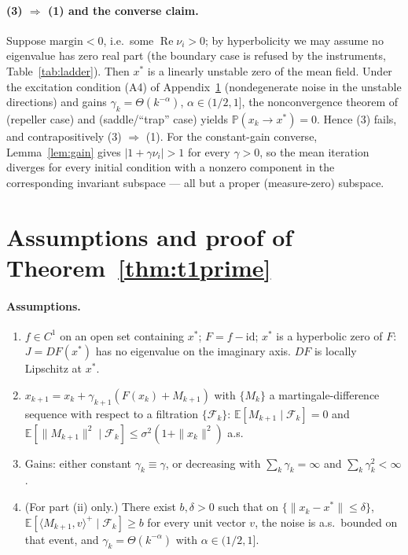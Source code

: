 \documentclass[pmlr]{jmlr}
\newcommand{\E}{\mathbb{E}}
\newcommand{\Prob}{\mathbb{P}}
\newcommand{\margin}{\mathrm{margin}}
\begin{document}
\paragraph{(3) $\Rightarrow$ (1) and the converse claim.} Suppose $\margin < 0$, i.e.\ some
$\operatorname{Re}\nu_i > 0$; by hyperbolicity we may assume no eigenvalue has zero real part
(the boundary case is refused by the instruments, Table~\ref{tab:ladder}). Then $x^*$ is a
linearly unstable zero of the mean field. Under the excitation condition (A4) of
Appendix~\ref{app:t1prime} (nondegenerate noise in the unstable directions) and gains
$\gamma_k = \Theta(k^{-\alpha})$, $\alpha \in (1/2, 1]$, the nonconvergence theorem of
\citet{pemantle1990nonconvergence} (repeller case) and \citet{brandiere1996algorithmes}
(saddle/``trap'' case) yields $\Prob(x_k \to x^*) = 0$. Hence (3) fails, and contrapositively
(3) $\Rightarrow$ (1). For the constant-gain converse, Lemma~\ref{lem:gain} gives
$|1 + \gamma\nu_i| > 1$ for every $\gamma > 0$, so the mean iteration diverges for every initial
condition with a nonzero component in the corresponding invariant subspace --- all but a proper
(measure-zero) subspace. \hfill\BlackBox

\section{Assumptions and proof of Theorem~\ref{thm:t1prime}}\label{app:t1prime}

\paragraph{Assumptions.}
\begin{enumerate}
\item[(A1)] $f \in C^1$ on an open set containing $x^*$; $F = f - \mathrm{id}$; $x^*$ is a
hyperbolic zero of $F$: $J = DF(x^*)$ has no eigenvalue on the imaginary axis. $DF$ is locally
Lipschitz at $x^*$.
\item[(A2)] $x_{k+1} = x_k + \gamma_{k+1}(F(x_k) + M_{k+1})$ with $\{M_k\}$ a
martingale-difference sequence with respect to a filtration $\{\mathcal{F}_k\}$:
$\E[M_{k+1} \mid \mathcal{F}_k] = 0$ and
$\E[\|M_{k+1}\|^2 \mid \mathcal{F}_k] \leq \sigma^2 (1 + \|x_k\|^2)$ a.s.
\item[(A3)] Gains: either constant $\gamma_k \equiv \gamma$, or decreasing with
$\sum_k \gamma_k = \infty$ and $\sum_k \gamma_k^2 < \infty$.
\item[(A4)] (For part (ii) only.) There exist $b, \delta > 0$ such that on
$\{\|x_k - x^*\| \leq \delta\}$,
$\E[\langle M_{k+1}, v \rangle^+ \mid \mathcal{F}_k] \geq b$ for every unit vector $v$, the
noise is a.s.\ bounded on that event, and $\gamma_k = \Theta(k^{-\alpha})$ with
$\alpha \in (1/2, 1]$.
\end{enumerate}
\end{document}
